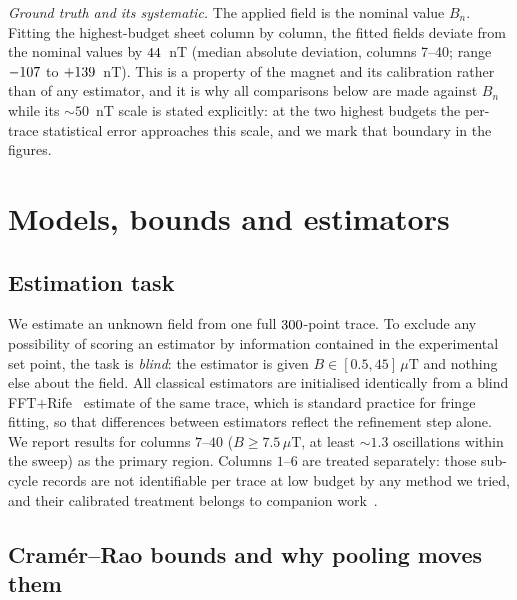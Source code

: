 \documentclass[aps,pra,twocolumn,superscriptaddress,nofootinbib]{revtex4-2}
\newcommand{\muT}{\,\mu\mathrm{T}}
\begin{document}
\emph{Ground truth and its systematic.} The applied field is the nominal value $B_n$.
Fitting the highest-budget sheet column by column, the fitted fields deviate from the
nominal values by $44$~nT (median absolute deviation, columns 7--40; range
$-107$ to $+139$~nT). This is a property of the magnet and its calibration rather
than of any estimator, and it is why all comparisons below are made against $B_n$ while its
$\sim\!50$~nT scale is stated explicitly: at the two highest budgets the per-trace
statistical error approaches this scale, and we mark that boundary in the figures.

\section{Models, bounds and estimators}

\subsection{Estimation task}

We estimate an unknown field from one full $300$-point trace. To exclude any possibility
of scoring an estimator by information contained in the experimental set point, the task is
\emph{blind}: the estimator is given $B\in[0.5,45]\muT$ and nothing else about the field.
All classical estimators are initialised identically from a blind FFT$+$Rife~\cite{Rife1970}
estimate of the same trace, which is standard practice for fringe fitting, so that
differences between estimators reflect the refinement step alone. We report results for
columns $7$--$40$ ($B\ge7.5\muT$, at least $\sim\!1.3$ oscillations within the sweep) as
the primary region. Columns $1$--$6$ are treated separately: those sub-cycle records are
not identifiable per trace at low budget by any method we tried, and their calibrated
treatment belongs to companion work~\cite{L1companion}.

\subsection{Cram\'er--Rao bounds and why pooling moves them}
\end{document}

